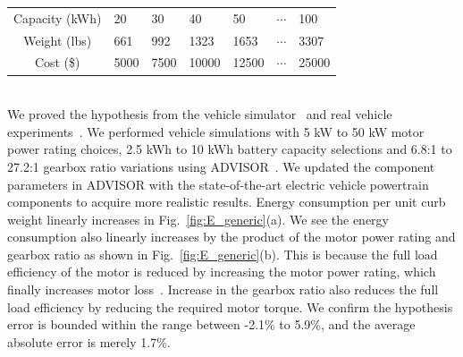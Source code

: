 \documentclass[journal]{IEEEtran}
\begin{document}
{{{{\begin{tabularx}{\linewidth}{|c|Y|Y|Y|Y|Y|Y|}
\hline
{}	 \\ \hline
{}	Capacity (kWh)	&20		&30		&40		&50		&$\cdots$	&100	\\ \hline
{}	Weight (lbs)		&661	&992	&1323	&1653	&$\cdots$	&3307	\\ \hline
{}	Cost (\$)			&5000	&7500	&10000	&12500	&$\cdots$	&25000	\\ \hline
\end{tabularx}

}
}}}
~\\



We proved  the hypothesis from the vehicle simulator~\cite{Markel:JPS02} and real vehicle experiments~\cite{Chang:ICCAD14}. %
We performed vehicle simulations with 5 kW to 50 kW motor power rating choices, 2.5 kWh to 10 kWh battery capacity selections and 6.8:1 to 27.2:1 gearbox ratio variations using ADVISOR~\cite{Markel:JPS02}. We updated the component parameters in ADVISOR with the state-of-the-art electric vehicle powertrain components to acquire more realistic results. 
Energy consumption per unit curb weight linearly increases in Fig.~\ref{fig:E_generic}(a). We see the energy consumption also linearly increases by the product of the motor power rating and gearbox ratio as shown in Fig.~\ref{fig:E_generic}(b). This is because the full load efficiency of the motor is reduced by increasing the motor power rating, which finally increases motor loss~\cite{motor_eff}. Increase in the gearbox ratio also reduces the full load efficiency by reducing the required motor torque. We confirm the hypothesis error is bounded within the range between -2.1\% to 5.9\%, and the average absolute error is merely 1.7\%.
\end{document}
